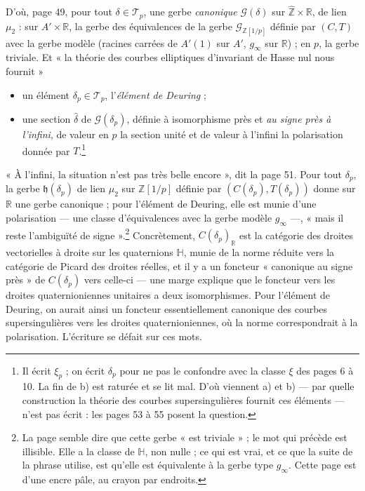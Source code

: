 \documentclass[11pt,a4paper]{article}
\begin{document}
D'où, page 49, pour tout $\delta \in \mathcal{T}_{p}$, une gerbe
\emph{canonique} $\mathcal{G}(\delta)$ sur $\widehat{\mathbb{Z}} \times
\mathbb{R}$, de lien $\mu_{2}$ : sur $A' \times \mathbb{R}$, la gerbe des
équivalences de la gerbe $\mathcal{G}_{\mathbb{Z}[1/p]}$ définie par $(C, T)$
avec la gerbe modèle (racines carrées de $A'(1)$ sur $A'$, $g_{\infty}$ sur
$\mathbb{R}$) ; en $p$, la gerbe triviale. Et « la théorie des courbes
elliptiques d'invariant de Hasse nul nous fournit »
\begin{itemize}
  \item[a)] un élément $\delta_{p} \in \mathcal{T}_{p}$, l'\emph{élément de
  Deuring} ;
  \item[b)] une section $\hat{\delta}$ de $\mathcal{G}(\delta_{p})$, définie à
  isomorphisme près et \emph{au signe près à l'infini}, de valeur en $p$ la
  section unité et de valeur à l'infini la polarisation donnée par
  $T$.\footnote{Il écrit $\xi_{p}$ ; on écrit $\delta_{p}$ pour ne pas le
  confondre avec la classe $\xi$ des pages 6 à 10. La fin de b) est raturée et
  se lit mal. D'où viennent a) et b) --- par quelle construction la théorie des
  courbes supersingulières fournit ces éléments --- n'est pas écrit : les pages
  53 à 55 posent la question.}
\end{itemize}

« À l'infini, la situation n'est pas très belle encore », dit la page 51. Pour
tout $\delta_{p}$, la gerbe $\mathfrak{h}(\delta_{p})$ de lien $\mu_{2}$ sur
$\mathbb{Z}[1/p]$ définie par $(C(\delta_{p}), T(\delta_{p}))$ donne sur
$\mathbb{R}$ une gerbe canonique ; pour l'élément de Deuring, elle est munie
d'une polarisation --- une classe d'équivalences avec la gerbe modèle
$g_{\infty}$ ---, « mais il reste l'ambiguïté de signe ».\footnote{La page
semble dire que cette gerbe « est triviale » ; le mot qui précède est
illisible. Elle a la classe de $\mathbb{H}$, non nulle ; ce qui est vrai, et ce
que la suite de la phrase utilise, est qu'elle est équivalente à la gerbe type
$g_{\infty}$. Cette page est d'une encre pâle, au crayon par endroits.}
Concrètement, $C(\delta_{p})_{\mathbb{R}}$ est la catégorie des droites
vectorielles à droite sur les quaternions $\mathbb{H}$, munie de la norme réduite
vers la catégorie de Picard des droites réelles, et il y a un foncteur
« canonique au signe près » de $C(\delta_{p})$ vers celle-ci --- une marge
explique que le foncteur vers les droites quaternioniennes unitaires a deux
isomorphismes. Pour l'élément de Deuring, on aurait ainsi un foncteur
essentiellement canonique des courbes supersingulières vers les droites
quaternioniennes, où la norme correspondrait à la polarisation. L'écriture se
défait sur ces mots.
\end{document}
